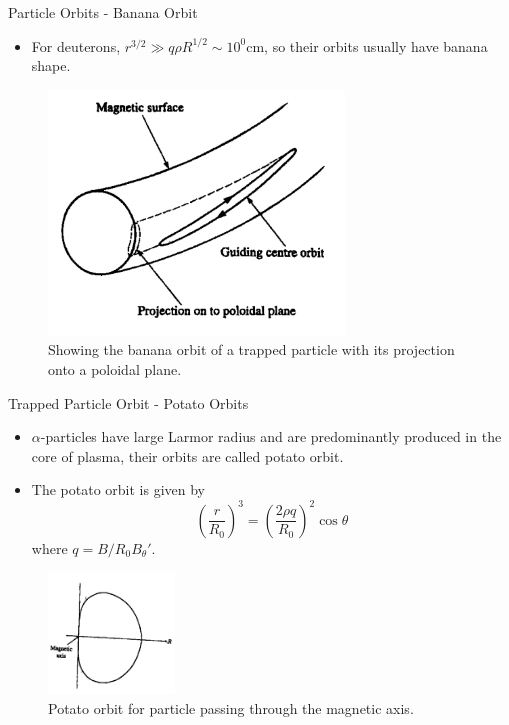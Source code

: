 \begin{frame} {Particle Orbits - Banana Orbit}
    \begin{itemize}
        \item For deuterons, $r^{3/2} \gg q\rho R^{1/2} \sim 10^0$\unit{\cm}, so their orbits usually have banana shape.
    \end{itemize}
    \begin{figure}
        \centering
        \includegraphics[width=0.7\textwidth]{figures/banana-orbit.png}
        \caption{Showing the banana orbit of a trapped particle with its projection onto a poloidal plane.}
        \label{fig:banana-orbit}
    \end{figure}
\end{frame}

\begin{frame} {Trapped Particle Orbit - Potato Orbits}
    \begin{itemize}
        \item $\alpha$-particles have large Larmor radius and are predominantly produced in the core of plasma, their orbits are called potato orbit.
        \item The potato orbit is given by
              \[ \left(\frac{r}{R_0}\right)^3 = \left(\frac{2\rho q}{R_0}\right)^2\cos\theta \]
              where $q=B/R_0B_\theta'$.
    \end{itemize}
    \begin{figure}
        \centering
        \includegraphics[width=0.3\textwidth]{figures/potato-orbit.png}
        \caption{Potato orbit for particle passing through the magnetic axis.}
        \label{fig:potato-orbit}
    \end{figure}
\end{frame}